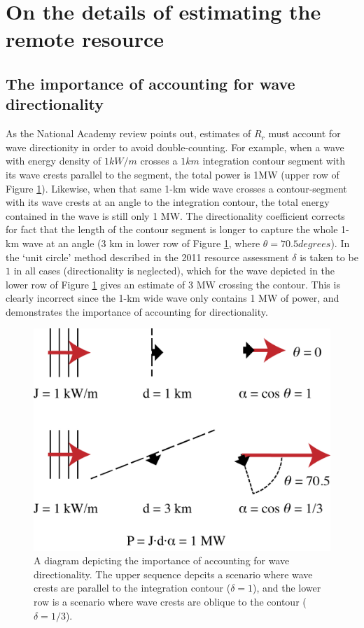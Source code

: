 \section{On the details of estimating the remote resource} \label{appendix:one-way-method}

\subsection{The importance of accounting for wave directionality} \label{appendix:directionality}


As the National Academy review points out, estimates of $R_r$ must account for wave directionity in order to avoid double-counting. For example, when a wave with energy density of $1 \unit{kW/m}$ crosses a $1 \unit{km}$ integration contour segment with its wave crests parallel to the segment, the total power is 1MW (upper row of Figure \ref{fig:directionality}). Likewise, when that same 1-km wide wave crosses a contour-segment with its wave crests at an angle to the integration contour, the total energy contained in the wave is still only 1 MW. The directionality coefficient corrects for fact that the length of the contour segment is longer to capture the whole 1-km wave at an angle (3 km in lower row of Figure \ref{fig:directionality}, where $\theta = 70.5 \unit{degrees}$). In the `unit circle' method described in the 2011 resource assessment $\delta$ is taken to be $1$ in all cases (directionality is neglected), which for the wave depicted in the lower row of Figure \ref{fig:directionality} gives an estimate of 3 MW crossing the contour. This is clearly incorrect since the 1-km wide wave only contains 1 MW of power, and demonstrates the importance of accounting for directionality.

\begin{figure}[ht]
    \centering
    \includegraphics[width=0.6 \linewidth]{../diagram/Dot-Product_Schematic01.png}
    \caption{A diagram depicting the importance of accounting for wave directionality. The upper sequence depcits a scenario where wave crests are parallel to the integration contour ($\delta = 1$), and the lower row is a scenario where wave crests are oblique to the contour ($\delta = 1/3$). }
    \label{fig:directionality}
\end{figure}

